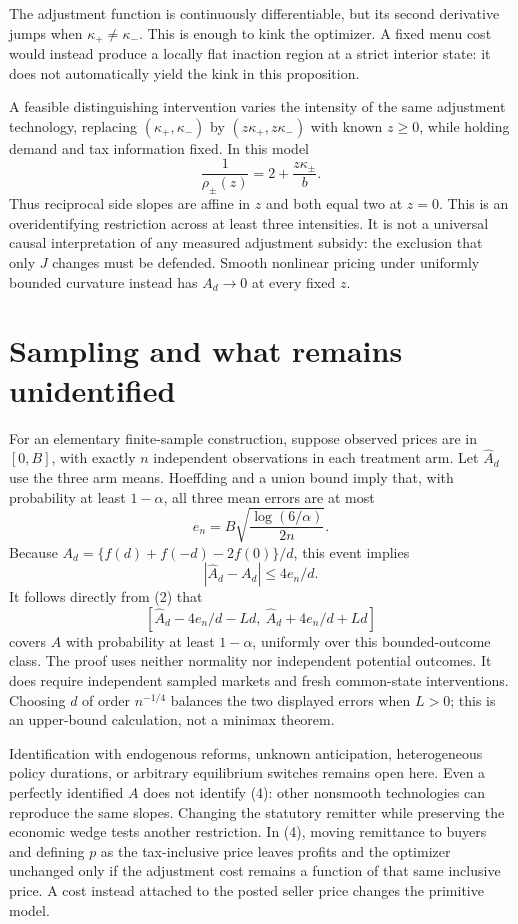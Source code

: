 \documentclass[11pt]{article}
\theoremstyle{remark}
\begin{document}
The adjustment function is continuously differentiable, but its second derivative jumps when $\kappa_+\ne\kappa_-$. This is enough to kink the optimizer. A fixed menu cost would instead produce a locally flat inaction region at a strict interior state: it does not automatically yield the kink in this proposition.

A feasible distinguishing intervention varies the intensity of the same adjustment technology, replacing $(\kappa_+,\kappa_-)$ by $(z\kappa_+,z\kappa_-)$ with known $z\geq0$, while holding demand and tax information fixed. In this model
\[
 \frac1{\rho_\pm(z)}=2+\frac{z\kappa_\pm}{b}.             \tag{5}
\]
Thus reciprocal side slopes are affine in $z$ and both equal two at $z=0$. This is an overidentifying restriction across at least three intensities. It is not a universal causal interpretation of any measured adjustment subsidy: the exclusion that only $J$ changes must be defended. Smooth nonlinear pricing under uniformly bounded curvature instead has $A_d\to0$ at every fixed $z$.

\section{Sampling and what remains unidentified}
For an elementary finite-sample construction, suppose observed prices are in $[0,B]$, with exactly $n$ independent observations in each treatment arm. Let $\widehat A_d$ use the three arm means. Hoeffding and a union bound imply that, with probability at least $1-\alpha$, all three mean errors are at most
\[
 e_n=B\sqrt{\frac{\log(6/\alpha)}{2n}}.
\]
Because $A_d=\{f(d)+f(-d)-2f(0)\}/d$, this event implies
\[
 |\widehat A_d-A_d|\leq4e_n/d.
\]
It follows directly from (2) that
\[
 [\widehat A_d-4e_n/d-Ld,\ \widehat A_d+4e_n/d+Ld]         \tag{6}
\]
covers $A$ with probability at least $1-\alpha$, uniformly over this bounded-outcome class. The proof uses neither normality nor independent potential outcomes. It does require independent sampled markets and fresh common-state interventions. Choosing $d$ of order $n^{-1/4}$ balances the two displayed errors when $L>0$; this is an upper-bound calculation, not a minimax theorem.

Identification with endogenous reforms, unknown anticipation, heterogeneous policy durations, or arbitrary equilibrium switches remains open here. Even a perfectly identified $A$ does not identify (4): other nonsmooth technologies can reproduce the same slopes. Changing the statutory remitter while preserving the economic wedge tests another restriction. In (4), moving remittance to buyers and defining $p$ as the tax-inclusive price leaves profits and the optimizer unchanged only if the adjustment cost remains a function of that same inclusive price. A cost instead attached to the posted seller price changes the primitive model.
\end{document}
